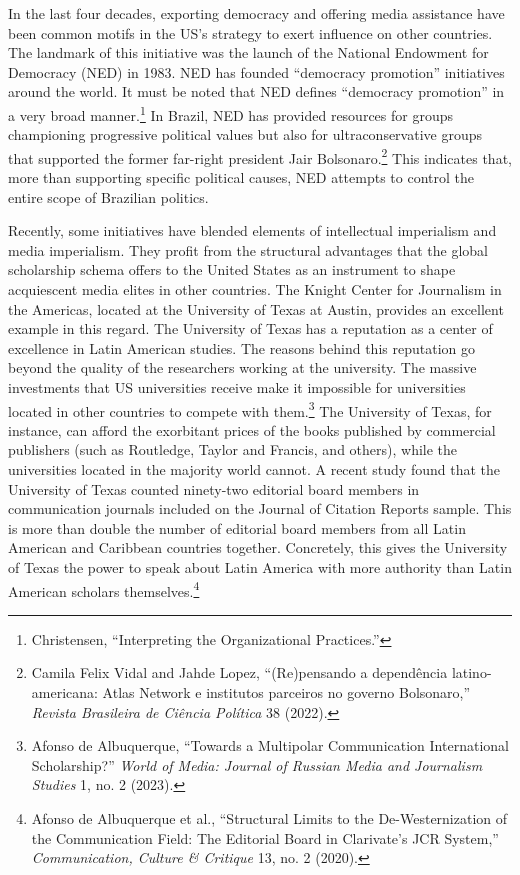 \documentclass{tufte-handout}
\begin{document}
In the last four decades, exporting democracy and offering media
assistance have been common motifs in the US's strategy to exert
influence on other countries. The landmark of this initiative was the
launch of the National Endowment for Democracy (NED) in 1983. NED has
founded ``democracy promotion'' initiatives around the world. It must be
noted that NED defines ``democracy promotion'' in a very broad
manner.\footnote{Christensen, ``Interpreting the Organizational
  Practices.''} In Brazil, NED has provided resources for groups
championing progressive political values but also for ultraconservative
groups that supported the former far-right president Jair
Bolsonaro.\footnote{Camila Felix Vidal and Jahde Lopez,
  ``(Re)pensando a dependência latino-americana: Atlas Network e
  institutos parceiros no governo Bolsonaro,'' \emph{Revista Brasileira
  de Ciência Política} 38
  (2022).}
This indicates that, more than supporting specific political causes, NED
attempts to control the entire scope of Brazilian politics.

Recently, some initiatives have blended elements of intellectual
imperialism and media imperialism. They profit from the structural
advantages that the global scholarship schema offers to the United
States as an instrument to shape acquiescent media elites in other
countries. The Knight Center for Journalism in the Americas, located at
the University of Texas at Austin, provides an excellent example in this
regard. The University of Texas has a reputation as a center of
excellence in Latin American studies. The reasons behind this reputation
go beyond the quality of the researchers working at the university. The
massive investments that US universities receive make it impossible for
universities located in other countries to compete with them.\footnote{Afonso
  de Albuquerque, ``Towards a Multipolar Communication International
  Scholarship?'' \emph{World of Media: Journal of Russian Media and
  Journalism Studies} 1, no. 2 (2023).} The University of Texas, for
instance, can afford the exorbitant prices of the books published by
commercial publishers (such as Routledge, Taylor and Francis, and
others), while the universities located in the majority world cannot. A
recent study found that the University of Texas counted ninety-two
editorial board members in communication journals included on the
Journal of Citation Reports sample. This is more than double the number
of editorial board members from all Latin American and Caribbean
countries together. Concretely, this gives the University of Texas the
power to speak about Latin America with more authority than Latin
American scholars themselves.\footnote{Afonso de Albuquerque et al.,
  ``Structural Limits to the De-Westernization of the Communication
  Field: The Editorial Board in Clarivate's JCR System,''
  \emph{Communication, Culture \& Critique} 13, no. 2 (2020).}
\end{document}
